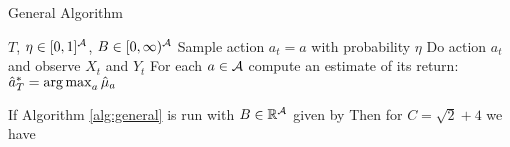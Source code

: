 \begin{algorithm}[H]
\caption{General Algorithm}\label{alg:general}
\begin{algorithmic}
 $T$, $\eta \in [0,1]^{\mathcal A}$, $B \in [0,\infty)^{\mathcal A}$
\STATE Sample action $a_t = a$ with probability $\eta$
\STATE Do action $a_t$ and observe $X_t$ and $Y_t$
\ENDFOR
\STATE For each $a \in \mathcal A$ compute an estimate of its return:
 $\hat a^*_T = \argmax_a \hat \mu_a$
\end{algorithmic}
\end{algorithm}

\begin{theorem}\label{thm:general}
If Algorithm \ref{alg:general} is run with $B \in \mathbb R^{\mathcal A}$ given by
Then for $C = \sqrt{2} + 4$ we have
\end{theorem}


